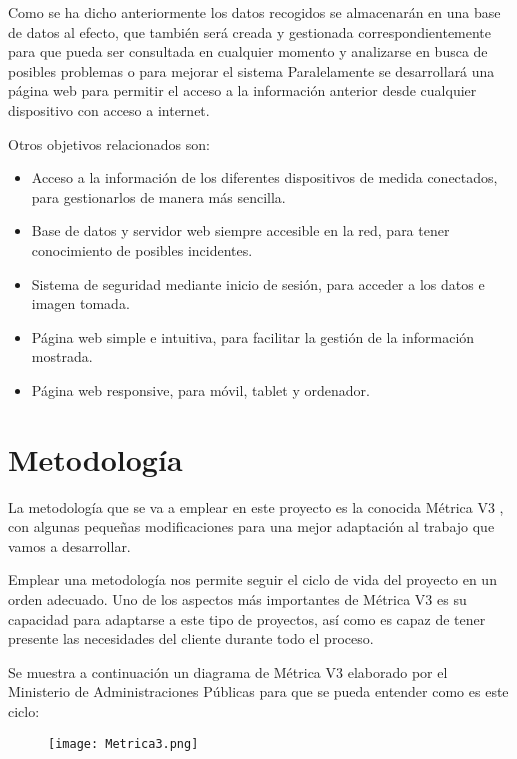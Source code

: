 Como se ha dicho anteriormente los datos recogidos se almacenarán en una base de datos al efecto, que también será creada y gestionada correspondientemente para que pueda ser consultada  en cualquier momento y analizarse en busca de posibles problemas o para mejorar el sistema Paralelamente se desarrollará una página web para permitir el acceso a la información anterior desde cualquier dispositivo con acceso a internet.

Otros objetivos relacionados son:
\begin{itemize}
    \item Acceso a la información de los diferentes dispositivos de medida conectados, para gestionarlos de manera más sencilla.
    \item Base de datos y servidor web siempre accesible en la red, para tener conocimiento de posibles incidentes.
    \item Sistema de seguridad mediante inicio de sesión, para acceder a los datos e imagen tomada.
    \item Página web simple e intuitiva, para facilitar la gestión de la información mostrada.
    \item Página web responsive, para móvil, tablet y ordenador.
\end{itemize}

\section{Metodología}
La metodología que se va a emplear en este proyecto es la conocida Métrica V3 \cite{portal_administracion_electronica_metrica_nodate}, con algunas pequeñas modificaciones para una mejor adaptación al trabajo que vamos a desarrollar.

Emplear una metodología nos permite seguir el ciclo de vida del proyecto en un orden adecuado. Uno de los aspectos más importantes de Métrica V3 es su capacidad para adaptarse a este tipo de proyectos, así como es capaz de tener presente  las necesidades del cliente durante todo el proceso.

Se muestra a continuación un diagrama de Métrica V3 elaborado por el Ministerio de Administraciones Públicas para que se pueda entender como es este ciclo:

\begin{figure}[H]
	{\texttt{[image: Metrica3.png]}}
\end{figure}

